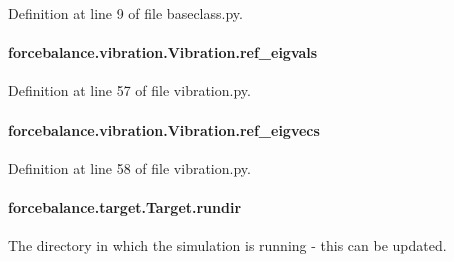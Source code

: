 Definition at line 9 of file baseclass.\-py.

\hypertarget{classforcebalance_1_1vibration_1_1Vibration_ab9913cb05e66e53a5781237baf9ea2e1}{
\paragraph[{ref\-\_\-eigvals}]{\setlength{\rightskip}{0pt plus 5cm}forcebalance.\-vibration.\-Vibration.\-ref\-\_\-eigvals}}\label{classforcebalance_1_1vibration_1_1Vibration_ab9913cb05e66e53a5781237baf9ea2e1}


Definition at line 57 of file vibration.\-py.

\hypertarget{classforcebalance_1_1vibration_1_1Vibration_ae9c5479bd3b01ecb3d2d40a9487ccac5}{
\paragraph[{ref\-\_\-eigvecs}]{\setlength{\rightskip}{0pt plus 5cm}forcebalance.\-vibration.\-Vibration.\-ref\-\_\-eigvecs}}\label{classforcebalance_1_1vibration_1_1Vibration_ae9c5479bd3b01ecb3d2d40a9487ccac5}


Definition at line 58 of file vibration.\-py.

\hypertarget{classforcebalance_1_1target_1_1Target_a6872de5b2d4273b82336ea5b0da29c9e}{
\paragraph[{rundir}]{\setlength{\rightskip}{0pt plus 5cm}forcebalance.\-target.\-Target.\-rundir\hspace{0.3cm}{\ttfamily [inherited]}}}\label{classforcebalance_1_1target_1_1Target_a6872de5b2d4273b82336ea5b0da29c9e}


The directory in which the simulation is running -\/ this can be updated. 

